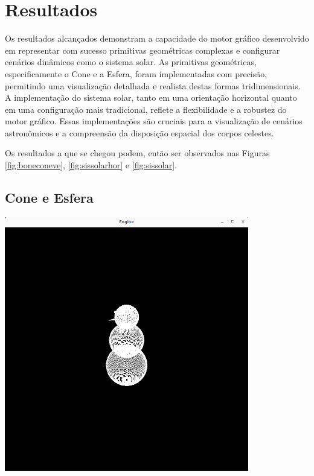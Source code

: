 \section{Resultados}
Os resultados alcançados demonstram a capacidade do motor gráfico desenvolvido 
em representar com sucesso primitivas geométricas complexas e configurar cenários 
dinâmicos como o sistema solar. As primitivas geométricas, especificamente o Cone 
e a Esfera, foram implementadas com precisão, permitindo uma visualização detalhada 
e realista destas formas tridimensionais. A implementação do sistema solar, tanto em
uma orientação horizontal quanto em uma configuração mais tradicional, reflete a 
flexibilidade e a robustez do motor gráfico. Essas implementações são cruciais para 
a visualização de cenários astronômicos e a compreensão da disposição espacial dos 
corpos celestes.

\break
\noindent
Os resultados a que se chegou podem, então ser observados nas Figuras
\ref{fig:boneconeve}, \ref{fig:sissolarhor} e \ref{fig:sissolar}.

\subsection{Cone e Esfera}

\begin{center}
    \includegraphics[width=0.8\textwidth]{../imgs/boneconeve.png}
    \label{fig:boneconeve}
\end{center}

